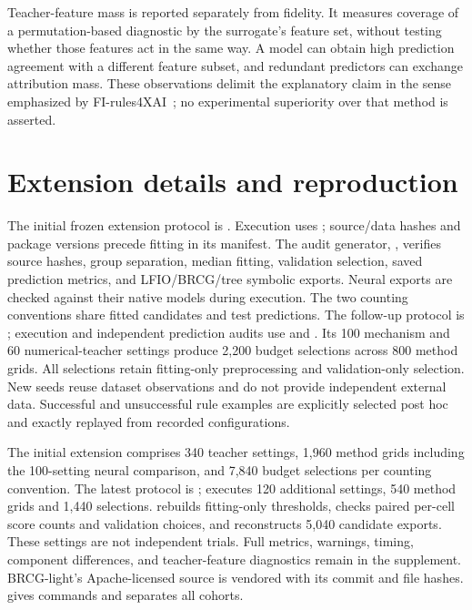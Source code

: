 \documentclass[a4paper,fleqn,review]{cas-sc}
\newcommand{\kbsbarrier}{\FloatBarrier}
\newcommand{\kbsbarrier}{}
\begin{document}
Teacher-feature mass is reported separately from fidelity. It measures coverage of a permutation-based diagnostic by the surrogate's feature set, without testing whether those features act in the same way. A model can obtain high prediction agreement with a different feature subset, and redundant predictors can exchange attribution mass. These observations delimit the explanatory claim in the sense emphasized by FI-rules4XAI~\citep{kozielski2025}; no experimental superiority over that method is asserted.
\kbsbarrier

\appendix
\section{Extension details and reproduction}\label{app:extension}


The initial frozen extension protocol is . Execution uses ; source/data hashes and package versions precede fitting in its manifest. The audit generator, , verifies source hashes, group separation, median fitting, validation selection, saved prediction metrics, and LFIO/BRCG/tree symbolic exports. Neural exports are checked against their native models during execution. The two counting conventions share fitted candidates and test predictions. The follow-up protocol is ; execution and independent prediction audits use  and . Its 100 mechanism and 60 numerical-teacher settings produce 2,200 budget selections across 800 method grids. All selections retain fitting-only preprocessing and validation-only selection. New seeds reuse dataset observations and do not provide independent external data. Successful and unsuccessful rule examples are explicitly selected post hoc and exactly replayed from recorded configurations.

The initial extension comprises 340 teacher settings, 1,960 method grids including the 100-setting neural comparison, and 7,840 budget selections per counting convention. The latest protocol is ;  executes 120 additional settings, 540 method grids and 1,440 selections.  rebuilds fitting-only thresholds, checks paired per-cell score counts and validation choices, and reconstructs 5,040 candidate exports. These settings are not independent trials. Full metrics, warnings, timing, component differences, and teacher-feature diagnostics remain in the supplement. BRCG-light's Apache-licensed source is vendored with its commit and file hashes.  gives commands and separates all cohorts.
\end{document}
